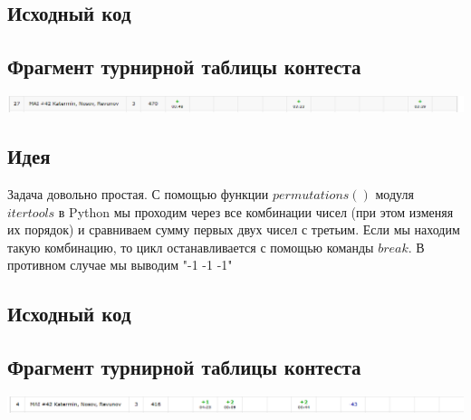 \subsection*{Исходный код}

\subsection*{Фрагмент турнирной таблицы контеста}
\includegraphics[scale=0.5]{standings/2703.png}\newline\noindent
\pagebreak


\subsection*{Идея}
Задача довольно простая. С помощью функции $permutations()$ модуля $itertools$ в Python мы проходим через все комбинации чисел (при этом изменяя их порядок) и сравниваем сумму первых двух чисел с третьим. Если мы находим такую комбинацию, то цикл останавливается с помощью команды $break$. В противном случае мы выводим "-1 -1 -1"
\subsection*{Исходный код}

\subsection*{Фрагмент турнирной таблицы контеста}
\includegraphics[scale=0.5]{standings/0304.png}\newline\noindent
\pagebreak


